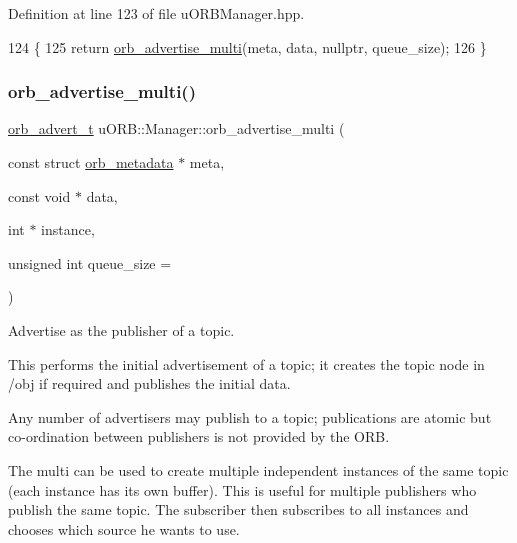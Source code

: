 Definition at line 123 of file u\+O\+R\+B\+Manager.\+hpp.


\begin{DoxyCode}
124     \{
125         \textcolor{keywordflow}{return} \hyperlink{classuORB_1_1Manager_a808104f7ebeab8f0d548dd9127344b24}{orb\_advertise\_multi}(meta, data, \textcolor{keyword}{nullptr}, queue\_size);
126     \}
\end{DoxyCode}
\mbox{\label{classuORB_1_1Manager_a808104f7ebeab8f0d548dd9127344b24}} 
\subsubsection{\texorpdfstring{orb\+\_\+advertise\+\_\+multi()}{orb\_advertise\_multi()}}
{\footnotesize\ttfamily \hyperlink{uORB_8h_a8d0cfa5f9ea6427a37057d6cea6dd990}{orb\+\_\+advert\+\_\+t} u\+O\+R\+B\+::\+Manager\+::orb\+\_\+advertise\+\_\+multi (\begin{DoxyParamCaption}\item[{const struct \hyperlink{structorb__metadata}{orb\+\_\+metadata} $\ast$}]{meta,  }\item[{const void $\ast$}]{data,  }\item[{int $\ast$}]{instance,  }\item[{unsigned int}]{queue\+\_\+size = {} }\end{DoxyParamCaption})}

Advertise as the publisher of a topic.

This performs the initial advertisement of a topic; it creates the topic node in /obj if required and publishes the initial data.

Any number of advertisers may publish to a topic; publications are atomic but co-\/ordination between publishers is not provided by the O\+RB.

The multi can be used to create multiple independent instances of the same topic (each instance has its own buffer). This is useful for multiple publishers who publish the same topic. The subscriber then subscribes to all instances and chooses which source he wants to use.


